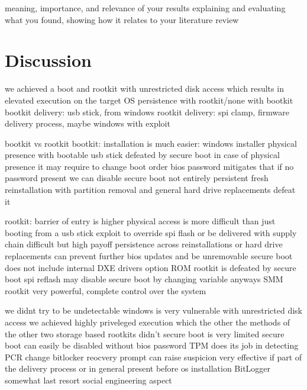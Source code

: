 

meaning, importance, and relevance of your results
explaining and evaluating what you found, showing how it relates to your literature review

\chapter{Discussion}

we achieved a boot and rootkit with unrestricted disk access which results in elevated execution on the target OS
persistence with rootkit/none with bootkit
bootkit delivery:
usb stick, from windows
rootkit delivery:
spi clamp, firmware delivery process, maybe windows with exploit

bootkit vs rootkit
bootkit:
installation is much easier:
windows installer
physical presence with bootable usb stick
defeated by secure boot
in case of physical presence it may require to change boot order
bios password mitigates that
if no password present we can disable secure boot
not entirely persistent
fresh reinstallation with partition removal and general hard drive replacements defeat it

rootkit:
barrier of entry is higher
physical access is more difficult than just booting from a usb stick
exploit to override spi flash or be delivered with supply chain difficult
but high payoff
persistence across reinstallations or hard drive replacements
can prevent further bios updates and be unremovable
secure boot does not include internal DXE drivers
option ROM rootkit is defeated by secure boot
spi reflash may disable secure boot by changing variable anyways
SMM rootkit very powerful, complete control over the system


we didnt try to be undetectable
windows is very vulnerable with unrestricted disk access
we achieved highly priveleged execution which the other the methods of the other two storage based rootkits didn't
secure boot is very limited
secure boot can easily be disabled without bios password
TPM does its job in detecting PCR change
bitlocker reocvery prompt can raise suspicion
very effective if part of the delivery process or in general present before os installation
BitLogger somewhat last resort
social engineering aspect


